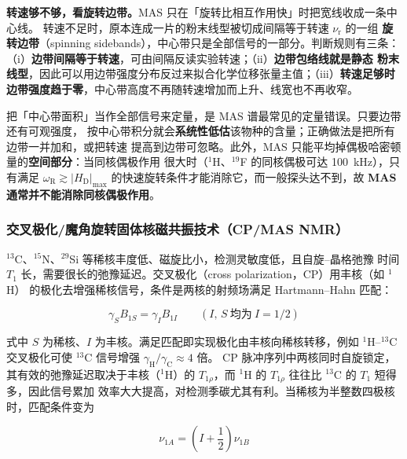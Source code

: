 \begin{measure}
\textbf{转速够不够，看旋转边带。}MAS 只在「旋转比相互作用快」时把宽线收成一条中心线。
转速不足时，原本连成一片的粉末线型被切成间隔等于转速 $\nu_{\mathrm{r}}$ 的一组
\textbf{旋转边带}（spinning sidebands），中心带只是全部信号的一部分。判断规则有三条：
（i）\textbf{边带间隔等于转速}，可由间隔反读实验转速；（ii）\textbf{边带包络线就是静态
粉末线型}，因此可以用边带强度分布反过来拟合化学位移张量主值；（iii）\textbf{转速足够时
边带强度趋于零}，中心带高度不再随转速增加而上升、线宽也不再收窄。
\end{measure}

\begin{pitfall}
把「中心带面积」当作全部信号来定量，是 MAS 谱最常见的定量错误。只要边带还有可观强度，
按中心带积分就会\textbf{系统性低估}该物种的含量；正确做法是把所有边带一并加和，或把转速
提高到边带可忽略。此外，MAS 只能平均掉偶极哈密顿量的\textbf{空间部分}：当同核偶极作用
很大时（$^{1}$H、$^{19}$F 的同核偶极可达 \qty{100}{kHz}），只有满足 $\omega_{\mathrm{R}}
\gtrsim |H_{\mathrm{D}}|_{\max}$ 的快速旋转条件才能消除它，而一般探头达不到，故
\textbf{MAS 通常并不能消除同核偶极作用}。
\end{pitfall}

\subsubsection{交叉极化/魔角旋转固体核磁共振技术（CP/MAS NMR）}
\label{sec:cp-mas}

$^{13}$C、$^{15}$N、$^{29}$Si 等稀核丰度低、磁旋比小，检测灵敏度低，且自旋--晶格弛豫
时间 $T_1$ 长，需要很长的弛豫延迟。交叉极化（cross polarization，CP）用丰核（如 $^{1}$H）
的极化去增强稀核信号，条件是两核的射频场满足 Hartmann--Hahn 匹配：

\begin{equation}
\label{eq:hh}
\gamma_{S}B_{1S}=\gamma_{I}B_{1I}
\qquad (I,\,S\ \text{均为}\ I=1/2)
\end{equation}

式中 $S$ 为稀核、$I$ 为丰核。满足匹配即实现极化由丰核向稀核转移，例如 $^{1}$H--$^{13}$C
交叉极化可使 $^{13}$C 信号增强 $\gamma_{\mathrm{H}}/\gamma_{\mathrm{C}}\approx4$ 倍。
CP 脉冲序列中两核同时自旋锁定，其有效的弛豫延迟取决于丰核（$^{1}$H）的
$T_{1\rho}$，而 $^{1}$H 的 $T_{1\rho}$ 往往比 $^{13}$C 的 $T_1$ 短得多，因此信号累加
效率大大提高，对检测季碳尤其有利。当稀核为半整数四极核时，匹配条件变为

\begin{equation}
\label{eq:hhquad}
\nu_{1A}=\left(I+\frac{1}{2}\right)\nu_{1B}
\end{equation}

